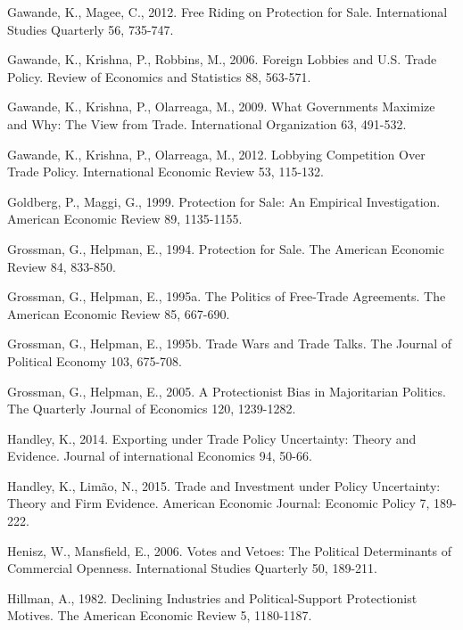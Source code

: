 \documentclass[10pt]{article}
\begin{document}
\begin{list}{}{\setlength{\leftmargin}{0.0in}\setlength{\rightmargin}{0.0in}\setlength{\itemindent}{0.0in}\setlength{\itemsep}{0.1in}}
\item Gawande, K., Magee, C., 2012. Free Riding on Protection for Sale. International Studies Quarterly 56, 735-747.

\item Gawande, K., Krishna, P., Robbins, M., 2006. Foreign Lobbies and U.S. Trade Policy. Review of Economics and Statistics 88, 563-571.

\item Gawande, K., Krishna, P., Olarreaga, M., 2009. What Governments Maximize and Why: The View from Trade. International Organization 63, 491-532.

\item Gawande, K., Krishna, P., Olarreaga, M., 2012. Lobbying Competition Over Trade Policy. International Economic Review 53, 115-132.

\item Goldberg, P., Maggi, G., 1999. Protection for Sale: An Empirical Investigation. American Economic Review 89, 1135-1155.

\item Grossman, G., Helpman, E., 1994. Protection for Sale. The American Economic Review 84, 833-850.

\item Grossman, G., Helpman, E., 1995a. The Politics of Free-Trade Agreements. The American Economic Review 85, 667-690.

\item Grossman, G., Helpman, E., 1995b. Trade Wars and Trade Talks. The Journal of Political Economy 103, 675-708.

\item Grossman, G., Helpman, E., 2005. A Protectionist Bias in Majoritarian Politics. The Quarterly Journal of Economics 120, 1239-1282.

\item Handley, K., 2014. Exporting under Trade Policy Uncertainty: Theory and Evidence. Journal of international Economics 94, 50-66.

\item Handley, K., Lim\~{a}o, N., 2015. Trade and Investment under Policy Uncertainty: Theory and Firm Evidence. American Economic Journal: Economic Policy 7, 189-222.

\item Henisz, W., Mansfield, E., 2006. Votes and Vetoes: The Political Determinants of Commercial Openness. International Studies Quarterly 50, 189-211.

\item Hillman, A., 1982. Declining Industries and Political-Support Protectionist Motives. The American Economic Review 5, 1180-1187.


\end{list}
\end{document}
